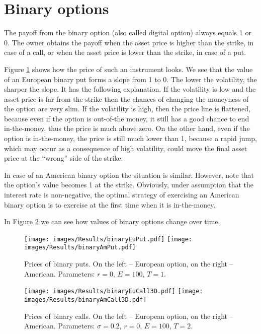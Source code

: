 \documentclass[a4paper,11pt, twoside]{book}
\theoremstyle{definition}
\theoremstyle{remark}
\begin{document}
\section{Binary options}
The payoff from the binary option (also called digital option) always equals 1 or 0. The owner obtains the payoff when the asset price is higher than the strike, in case of a call, or when the asset price is lower than the strike, in case of a put. 

Figure \ref{fig:results:binaryPut} shows how the price of such an instrument looks. We see that the value of an European binary put forms a slope from 1 to 0. The lower the volatility, the sharper the slope. It has the following explanation. If the volatility is low and the asset price is far from the strike then the chances of changing the moneyness of the option are very slim. If the volatility is high, then the price line is flattened, because even if the option is out-of-the money, it still has a good chance to end in-the-money, thus the price is much above zero. On the other hand, even if the option is in-the-money, the price is still much lower than 1, because a rapid jump, which may occur as a consequence of high volatility, could move the final asset price at the ``wrong'' side of the strike.

In case of an American binary option the situation is similar. However, note that the option's value becomes 1 at the strike. Obviously, under assumption that the interest rate is non-negative, the optimal strategy of exercising an American binary option is to exercise at the first time when it is in-the-money.

In Figure \ref{fig:results:binaryCall} we can see how values of binary options change over time.
\begin{figure}[!htb]
\centering
 \texttt{[image: images/Results/binaryEuPut.pdf]}
 \texttt{[image: images/Results/binaryAmPut.pdf]}
\caption{Prices of binary puts. On the left -- European option, on the right -- American. Parameters: $r=0$, $E=100$, $T=1$.}
\label{fig:results:binaryPut}
\end{figure}

\begin{figure}[!htb]
\centering
 \texttt{[image: images/Results/binaryEuCall3D.pdf]}
 \texttt{[image: images/Results/binaryAmCall3D.pdf]}
\caption{Prices of binary calls. On the left -- European option, on the right -- American. Parameters: $\sigma = 0.2$, $r=0$, $E=100$, $T=2$.}
\label{fig:results:binaryCall}
\end{figure}
\end{document}
